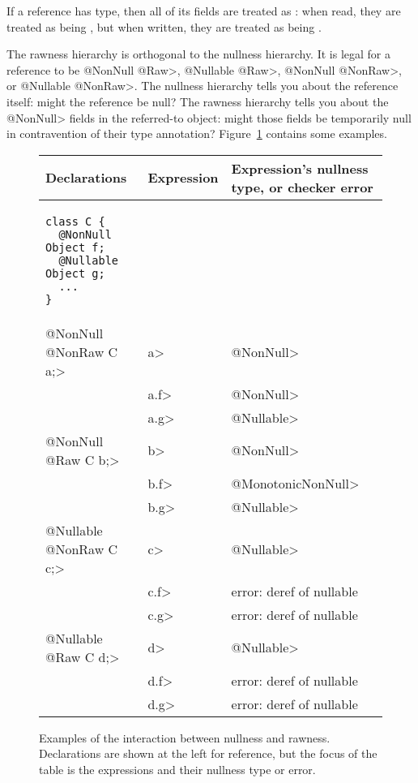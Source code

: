 
If a reference has
 type, then all of its  fields are treated as
:  when read, they are
treated as being , but when
written, they are treated as being
.


The rawness hierarchy is orthogonal to the nullness hierarchy.  It
is legal for a reference to be \<@NonNull @Raw>, \<@Nullable @Raw>,
\<@NonNull @NonRaw>, or \<@Nullable @NonRaw>.  The nullness hierarchy tells
you about the reference itself:  might the reference be null?  The rawness
hierarchy tells you about the \<@NonNull> fields in the referred-to object:
might those fields be temporarily null in contravention of their
type annotation?
Figure~\ref{fig-rawness-examples} contains some examples.

\begin{figure}
\begin{tabular}{l|l|l}
Declarations & Expression & Expression's nullness type, or checker error \\ \hline
\begin{minipage}{1.5in}
\begin{Verbatim}
class C {
  @NonNull Object f;
  @Nullable Object g;
  ...
}
\end{Verbatim}
\end{minipage} & & \\ \cline{2-3}
\<@NonNull @NonRaw C a;>
& \<a> & \<@NonNull> \\
& \<a.f> & \<@NonNull> \\
& \<a.g> & \<@Nullable> \\ \cline{2-3}
\<@NonNull @Raw C b;>
& \<b> & \<@NonNull> \\
& \<b.f> & \<@MonotonicNonNull> \\
& \<b.g> & \<@Nullable> \\ \cline{2-3}
\<@Nullable @NonRaw C c;>
& \<c> & \<@Nullable> \\
& \<c.f> & error: deref of nullable \\
& \<c.g> & error: deref of nullable \\ \cline{2-3}
\<@Nullable @Raw C d;>
& \<d> & \<@Nullable> \\
& \<d.f> & error: deref of nullable \\
& \<d.g> & error: deref of nullable \\
\end{tabular}
\caption{Examples of the interaction between nullness and rawness.
  Declarations are shown at the left for reference, but the focus of the
  table is the expressions and their nullness type or error.}
\label{fig-rawness-examples}
\end{figure}



